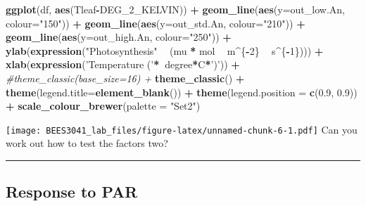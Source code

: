 \documentclass[]{article}
\newenvironment{Shaded}{\begin{snugshade}}{\end{snugshade}}
\newcommand{\CommentTok}[1]{\textcolor[rgb]{0.56,0.35,0.01}{\textit{#1}}}
\newcommand{\DataTypeTok}[1]{\textcolor[rgb]{0.13,0.29,0.53}{#1}}
\newcommand{\DecValTok}[1]{\textcolor[rgb]{0.00,0.00,0.81}{#1}}
\newcommand{\ErrorTok}[1]{\textcolor[rgb]{0.64,0.00,0.00}{\textbf{#1}}}
\newcommand{\FloatTok}[1]{\textcolor[rgb]{0.00,0.00,0.81}{#1}}
\newcommand{\KeywordTok}[1]{\textcolor[rgb]{0.13,0.29,0.53}{\textbf{#1}}}
\newcommand{\NormalTok}[1]{#1}
\newcommand{\OperatorTok}[1]{\textcolor[rgb]{0.81,0.36,0.00}{\textbf{#1}}}
\newcommand{\StringTok}[1]{\textcolor[rgb]{0.31,0.60,0.02}{#1}}
\begin{document}
\begin{Shaded}
\begin{Highlighting}[]
\KeywordTok{ggplot}\NormalTok{(df, }\KeywordTok{aes}\NormalTok{(Tleaf}\OperatorTok{-}\NormalTok{DEG_}\DecValTok{2}\NormalTok{_KELVIN)) }\OperatorTok{+}
\StringTok{  }\KeywordTok{geom_line}\NormalTok{(}\KeywordTok{aes}\NormalTok{(}\DataTypeTok{y=}\NormalTok{out_low.An, }\DataTypeTok{colour=}\StringTok{"150"}\NormalTok{)) }\OperatorTok{+}
\StringTok{  }\KeywordTok{geom_line}\NormalTok{(}\KeywordTok{aes}\NormalTok{(}\DataTypeTok{y=}\NormalTok{out_std.An, }\DataTypeTok{colour=}\StringTok{"210"}\NormalTok{)) }\OperatorTok{+}
\StringTok{  }\KeywordTok{geom_line}\NormalTok{(}\KeywordTok{aes}\NormalTok{(}\DataTypeTok{y=}\NormalTok{out_high.An, }\DataTypeTok{colour=}\StringTok{"250"}\NormalTok{)) }\OperatorTok{+}
\StringTok{  }\KeywordTok{ylab}\NormalTok{(}\KeywordTok{expression}\NormalTok{(}\StringTok{"Photosynthesis"} \OperatorTok{~}\StringTok{ }\NormalTok{(mu }\OperatorTok{*}\StringTok{ }\NormalTok{mol }\OperatorTok{~}\StringTok{  }\NormalTok{m}\OperatorTok{^}\NormalTok{\{}\OperatorTok{-}\DecValTok{2}\NormalTok{\}  }\OperatorTok{~}\StringTok{  }\NormalTok{s}\OperatorTok{^}\NormalTok{\{}\OperatorTok{-}\DecValTok{1}\NormalTok{\}))) }\OperatorTok{+}
\StringTok{  }\KeywordTok{xlab}\NormalTok{(}\KeywordTok{expression}\NormalTok{(}\StringTok{'Temperature ('}\OperatorTok{*}\ErrorTok{~}\NormalTok{degree}\OperatorTok{*}\NormalTok{C}\OperatorTok{*}\StringTok{')'}\NormalTok{)) }\OperatorTok{+}\StringTok{ }
\StringTok{  }\CommentTok{#theme_classic(base_size=16) +}
\StringTok{  }\KeywordTok{theme_classic}\NormalTok{() }\OperatorTok{+}
\StringTok{  }\KeywordTok{theme}\NormalTok{(}\DataTypeTok{legend.title=}\KeywordTok{element_blank}\NormalTok{()) }\OperatorTok{+}
\StringTok{  }\KeywordTok{theme}\NormalTok{(}\DataTypeTok{legend.position =} \KeywordTok{c}\NormalTok{(}\FloatTok{0.9}\NormalTok{, }\FloatTok{0.9}\NormalTok{)) }\OperatorTok{+}
\StringTok{  }\KeywordTok{scale_colour_brewer}\NormalTok{(}\DataTypeTok{palette =} \StringTok{"Set2"}\NormalTok{)}
\end{Highlighting}
\end{Shaded}

\texttt{[image: BEES3041\_lab\_files/figure-latex/unnamed-chunk-6-1.pdf]}
Can you work out how to test the factors two?

\begin{center}\rule{0.5\linewidth}{\linethickness}\end{center}

\hypertarget{response-to-par}{%
\subsection{Response to PAR}\label{response-to-par}}
\end{document}
